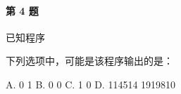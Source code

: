 \paragraph{第 4 题} 已知程序



下列选项中，可能是该程序输出的是：

A. 0 1 \quad
B. 0 0 \quad
C. 1 0 \quad
D. 114514 1919810 \quad
